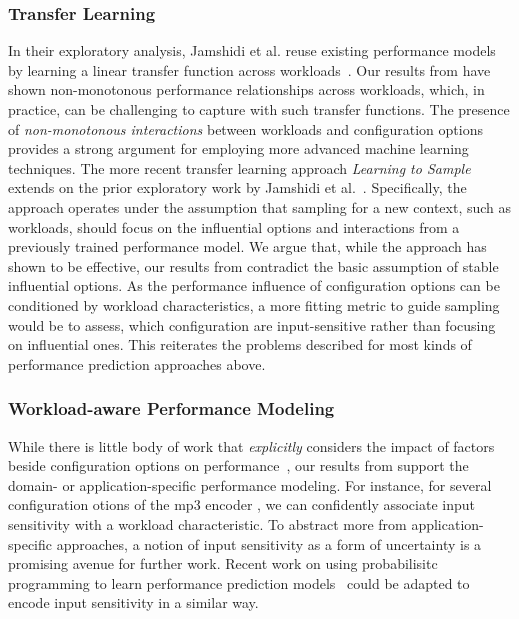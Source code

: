 {{\subsubsection{Transfer Learning} In their exploratory analysis, Jamshidi et al. reuse existing performance models by learning a linear transfer function across workloads~\cite{jamishidi_transfer_2017}. Our results from  have shown non-monotonous performance relationships across workloads, which, in practice, can be challenging to capture with such transfer functions. The presence of \textit{non-monotonous interactions} between workloads and configuration options provides a strong argument for employing more advanced machine learning techniques. 
The more recent transfer learning approach \emph{Learning to Sample}~\cite{jamshidi_learning_2018} extends on the prior exploratory work by Jamshidi et al.~\cite{jamishidi_transfer_2017}. Specifically, the approach operates under the assumption that sampling for a new context, such as workloads, should focus on the influential options and interactions from a previously trained performance model. We argue that, while the approach has shown to be effective, our results from  contradict the basic assumption of stable influential options. As the performance influence of configuration options can be conditioned by workload characteristics, a more fitting metric to guide sampling would be to assess, which configuration are input-sensitive rather than focusing on influential ones. This reiterates the problems described for most kinds of performance prediction approaches above.

\subsubsection{Workload-aware Performance Modeling} While there is little body of work that \textit{explicitly} considers the impact of factors beside configuration options on performance~\cite{koc_satune_2021}, our results from  support the domain- or application-specific performance modeling. For instance, for several configuration otions of the mp3 encoder \jumper, we can confidently associate input sensitivity with a workload characteristic. To abstract more from application-specific approaches, a notion of input sensitivity as a form of uncertainty is a promising avenue for further work. Recent work on using probabilisitc programming to learn performance prediction models~\cite{dorn2020} could be adapted to encode input sensitivity in a similar way.

}}
